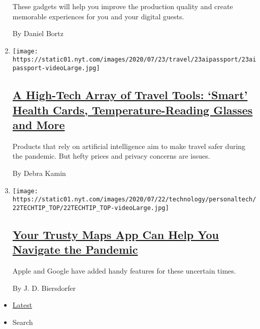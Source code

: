\begin{enumerate}
  These gadgets will help you improve the production quality and create
  memorable experiences for you and your digital guests.

  By Daniel Bortz
\item
  \texttt{[image: https://static01.nyt.com/images/2020/07/23/travel/23aipassport/23aipassport-videoLarge.jpg]}

  \hypertarget{a-high-tech-array-of-travel-tools-smart-health-cards-temperature-reading-glasses-and-more}{%
  \subsection{\texorpdfstring{\href{/2020/07/23/travel/artificial-intelligence-coronavirus-passport.html}{A
  High-Tech Array of Travel Tools: `Smart' Health Cards,
  Temperature-Reading Glasses and
  More}}{A High-Tech Array of Travel Tools: `Smart' Health Cards, Temperature-Reading Glasses and More}}\label{a-high-tech-array-of-travel-tools-smart-health-cards-temperature-reading-glasses-and-more}}

  Products that rely on artificial intelligence aim to make travel safer
  during the pandemic. But hefty prices and privacy concerns are issues.

  By Debra Kamin
\item
  \texttt{[image: https://static01.nyt.com/images/2020/07/22/technology/personaltech/22TECHTIP\_TOP/22TECHTIP\_TOP-videoLarge.jpg]}

  \hypertarget{your-trusty-maps-app-can-help-you-navigate-the-pandemic}{%
  \subsection{\texorpdfstring{\href{/2020/07/22/technology/personaltech/maps-apps-coronavirus-pandemic.html}{Your
  Trusty Maps App Can Help You Navigate the
  Pandemic}}{Your Trusty Maps App Can Help You Navigate the Pandemic}}\label{your-trusty-maps-app-can-help-you-navigate-the-pandemic}}

  Apple and Google have added handy features for these uncertain times.

  By J. D. Biersdorfer
\end{enumerate}

\begin{itemize}
\tightlist
\item
  \protect\hyperlink{stream-panel}{Latest}
\item
  Search
\end{itemize}

